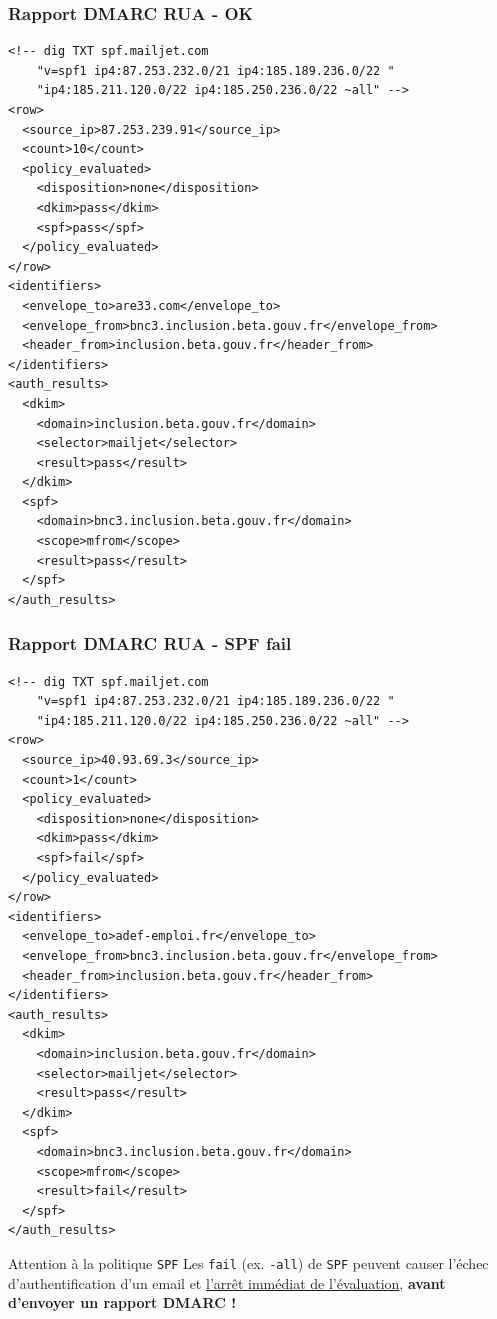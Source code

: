 \documentclass{beamer}
\begin{document}
\begin{frame}[fragile]
    \frametitle{Rapport DMARC RUA - OK}
    \begin{verbatim}
<!-- dig TXT spf.mailjet.com
    "v=spf1 ip4:87.253.232.0/21 ip4:185.189.236.0/22 "
    "ip4:185.211.120.0/22 ip4:185.250.236.0/22 ~all" -->
<row>
  <source_ip>87.253.239.91</source_ip>
  <count>10</count>
  <policy_evaluated>
    <disposition>none</disposition>
    <dkim>pass</dkim>
    <spf>pass</spf>
  </policy_evaluated>
</row>
<identifiers>
  <envelope_to>are33.com</envelope_to>
  <envelope_from>bnc3.inclusion.beta.gouv.fr</envelope_from>
  <header_from>inclusion.beta.gouv.fr</header_from>
</identifiers>
<auth_results>
  <dkim>
    <domain>inclusion.beta.gouv.fr</domain>
    <selector>mailjet</selector>
    <result>pass</result>
  </dkim>
  <spf>
    <domain>bnc3.inclusion.beta.gouv.fr</domain>
    <scope>mfrom</scope>
    <result>pass</result>
  </spf>
</auth_results>
    \end{verbatim}
\end{frame}

\begin{frame}[fragile]
    \frametitle{Rapport DMARC RUA - SPF fail}
    \begin{verbatim}
<!-- dig TXT spf.mailjet.com
    "v=spf1 ip4:87.253.232.0/21 ip4:185.189.236.0/22 "
    "ip4:185.211.120.0/22 ip4:185.250.236.0/22 ~all" -->
<row>
  <source_ip>40.93.69.3</source_ip>
  <count>1</count>
  <policy_evaluated>
    <disposition>none</disposition>
    <dkim>pass</dkim>
    <spf>fail</spf>
  </policy_evaluated>
</row>
<identifiers>
  <envelope_to>adef-emploi.fr</envelope_to>
  <envelope_from>bnc3.inclusion.beta.gouv.fr</envelope_from>
  <header_from>inclusion.beta.gouv.fr</header_from>
</identifiers>
<auth_results>
  <dkim>
    <domain>inclusion.beta.gouv.fr</domain>
    <selector>mailjet</selector>
    <result>pass</result>
  </dkim>
  <spf>
    <domain>bnc3.inclusion.beta.gouv.fr</domain>
    <scope>mfrom</scope>
    <result>fail</result>
  </spf>
</auth_results>
    \end{verbatim}
\end{frame}

\begin{frame}{Attention à la politique \texttt{SPF}} Les \texttt{fail} (ex.
    \texttt{-all}) de \texttt{SPF} peuvent causer l'échec d'authentification
    d'un email et
    \href{https://www.mailhardener.com/blog/why-mailhardener-recommends-spf-softfail-over-fail\#but-i-use-spf-hard-fail-and-never-had-a-problem}{l'arrêt
    immédiat de l'évaluation}, \textbf{avant d'envoyer un rapport DMARC !}
\end{frame}
\end{document}
